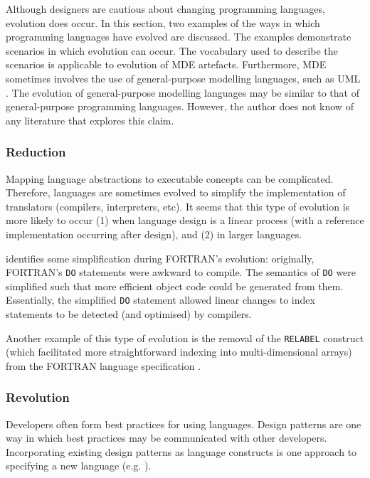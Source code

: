 Although designers are cautious about changing programming languages, evolution does occur. In this section, two examples of the ways in which programming languages have evolved are discussed. The examples demonstrate scenarios in which evolution can occur. The vocabulary used to describe the scenarios is applicable to evolution of MDE artefacts. Furthermore, MDE sometimes involves the use of general-purpose modelling languages, such as UML \cite{uml212}. The evolution of general-purpose modelling languages may be similar to that of general-purpose programming languages. However, the author does not know of any literature that explores this claim.

\subsubsection{Reduction}
Mapping language abstractions to executable concepts can be complicated. Therefore, languages are sometimes evolved to simplify the implementation of translators (compilers, interpreters, etc). It seems that this type of evolution is more likely to occur (1) when language design is a linear process (with a reference implementation occurring after design), and (2) in larger languages.

\cite{backus78history} identifies some simplification during FORTRAN's evolution: originally, FORTRAN's \verb|DO| statements were awkward to compile. The semantics of \verb|DO| were simplified such that more efficient object code could be generated from them. Essentially, the simplified \verb|DO| statement allowed linear changes to index statements to be detected (and optimised) by compilers.

Another example of this type of evolution is the removal of the \verb|RELABEL| construct (which facilitated more straightforward indexing into multi-dimensional arrays) from the FORTRAN language specification \cite{backus78history}.

\subsubsection{Revolution}
Developers often form best practices for using languages. Design patterns are one way in which best practices may be communicated with other developers. Incorporating existing design patterns as language constructs is one approach to specifying a new language (e.g. \cite{bosch98patterns}).

